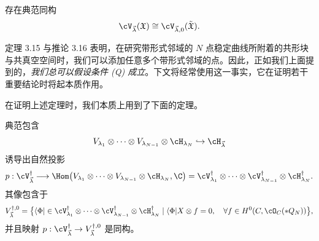 \begin{corollary}[3.16]
存在典范同构
\[
\cV_{\vec{\lambda}}(\mathfrak{X})\cong\cV_{\vec{\lambda},0}(\tilde{\mathfrak{X}}).
\]
\end{corollary}

\begin{remark}[3.17]
定理 3.15 与推论 3.16 表明，在研究带形式邻域的 $N$ 点稳定曲线所附着的共形块与共真空空间时，我们可以添加任意多个带形式邻域的点。因此，正如我们上面提到的，\emph{我们总可以假设条件 (Q) 成立}。下文将经常使用这一事实，它在证明若干重要结论时将起本质作用。
\end{remark}

在证明上述定理时，我们本质上用到了下面的定理。


\begin{theorem}[3.18]
典范包含
\[
V_{\lambda_1}\otimes\cdots\otimes V_{\lambda_{N-1}}\otimes\cH_{\lambda_N}
\hookrightarrow\cH_{\vec{\lambda}}
\]
诱导出自然投影
\[
p:\cV^{\dagger}_{\vec{\lambda}}\longrightarrow
\Hom\bigl(V_{\lambda_1}\otimes\cdots\otimes V_{\lambda_{N-1}}
\otimes\cH_{\lambda_N},\C\bigr)
=\cV^{\dagger}_{\lambda_1}\otimes\cdots\otimes
\cV^{\dagger}_{\lambda_{N-1}}\otimes\cH^{\dagger}_{\lambda_N}.
\]
其像包含于
\[
V^{\dagger,0}_{\vec{\lambda}}
=\bigl\{\langle\Phi|\in\cV^{\dagger}_{\lambda_1}\otimes\cdots\otimes
\cV^{\dagger}_{\lambda_{N-1}}\otimes\cH^{\dagger}_{\lambda_N}
\mid\langle\Phi|X\otimes f=0,\quad
\forall f\in H^0(C,\cO_C(*Q_N))\bigr\},
\]
并且映射 $p:\cV^{\dagger}_{\vec{\lambda}}\to V^{\dagger,0}_{\vec{\lambda}}$
是同构。
\end{theorem}

